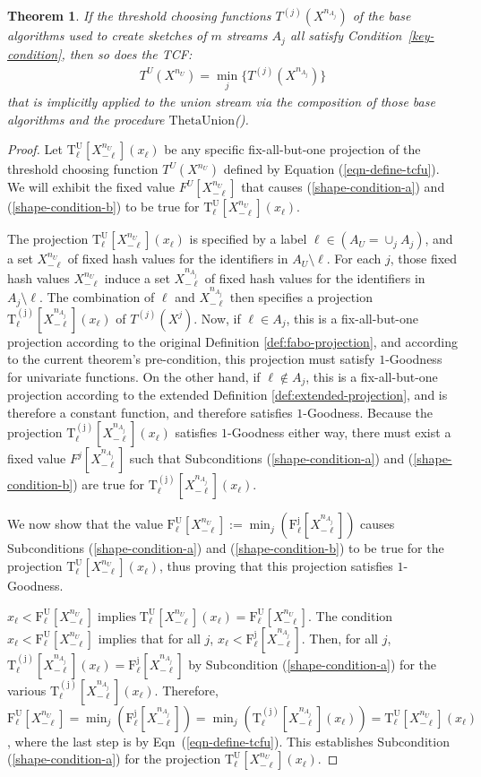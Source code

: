 \documentclass{article}
\newcommand{\tuxn}{\mathrm{T^U_\ell}[X^{n_U}_{-\ell}](x_\ell)}
\newcommand{\tjxn}{\mathrm{T^{(j)}_\ell}[X^{n_{A_j}}_{-\ell}](x_\ell)}
\newcommand{\xnj}{X^{n_{A_j}}}
\newcommand{\xnjml}{X^{n_{A_j}}_{-\ell}}
\newcommand{\xon}{X^{n_{U}}}
\newcommand{\xnu}{X^{n_U}}
\newcommand{\xnuml}{X^{n_{U}}_{-\ell}}
\newcommand{\atuxn}{\mathrm{T^U_\ell}[X^{n_U}_{-\ell}](x_\ell)}
\newcommand{\atjxn}{\mathrm{T^{(j)}_\ell}[X^{n_{A_j}}_{-\ell}](x_\ell)}
\newcommand{\afuxn}{\mathrm{F^U_\ell}[X^{n_U}_{-\ell}]}
\newcommand{\afjxn}{\mathrm{F^j_\ell}[X^{n_{A_j}}_{-\ell}]}
\newtheorem{theorem}{Theorem}[section]
\newcommand{\thetaunion}{\mathrm{ThetaUnion}}
\begin{document}
\begin{theorem}\label{thm-union-preserves-condition} \label{thm:preserved}
If the threshold choosing functions $T^{(j)}(\xnj)$ of the base algorithms used to create sketches 
of $m$ streams $A_j$ all satisfy Condition~\ref{key-condition},
then so does the TCF:
\begin{align}
T^U(\xon) = \min_j \{T^{(j)}(\xnj)\}\label{eqn-define-tcfu}
\end{align}
that is implicitly applied to the union stream via the composition of those base
algorithms and the procedure $\thetaunion$().
\end{theorem}
\begin{proof}
Let $\tuxn$ be any specific fix-all-but-one projection of the threshold choosing function 
$T^U(\xnu)$ defined by Equation (\ref{eqn-define-tcfu}). We will exhibit the fixed value $F^U[\xnuml]$ that
causes (\ref{shape-condition-a}) and (\ref{shape-condition-b}) to be true for $\tuxn$.

The projection $\tuxn$ is specified by a label $\ell \in (A_U = \cup_j A_j)$, and a set $\xnuml$ 
of fixed hash values for the identifiers in 
\mbox{$A_U \!\! \setminus \! \ell$}.
For each $j$, those fixed hash values $\xnuml$ induce a set $\xnjml$ of 
fixed hash values for the identifiers in $A_j \! \setminus \! \ell$. 
The combination of $\ell$ and $\xnjml$ then specifies
a projection $\tjxn$ of $T^{(j)}(X^j)$. 
Now, if $\ell \in A_j$, this is a fix-all-but-one projection according to the original Definition \ref{def:fabo-projection},
and according to the current theorem's pre-condition, this projection must satisfy $1$-Goodness for univariate functions.
On the other hand, if $\ell \not \in A_j$, this is a fix-all-but-one projection according to the extended Definition 
\ref{def:extended-projection}, and is therefore a constant function, and therefore 
satisfies $1$-Goodness.
Because the projection $\tjxn$ 
satisfies $1$-Goodness
either way, there must exist a fixed value $F^j[\xnjml]$
such that Subconditions (\ref{shape-condition-a}) and (\ref{shape-condition-b}) are true for $\tjxn$. 

\noindent We now show that the value $\afuxn := \min_j (\afjxn)$
causes Subconditions (\ref{shape-condition-a}) and (\ref{shape-condition-b}) to be true for the projection
$\tuxn$, thus proving that this projection
satisfies $1$-Goodness.


\medskip 
{} 
$x_\ell < \afuxn \; \mathrm{implies} \; \atuxn = \afuxn $. 
The condition $x_\ell < \afuxn$ implies
that  for all $j$, $x_\ell < \afjxn$. Then, for all $j$, $\atjxn = \afjxn$ 
by Subcondition (\ref{shape-condition-a}) for the various $\atjxn$. Therefore,
$\afuxn = \min_j (\afjxn) = \min_j (\atjxn) = \atuxn$,
where the last step is by Eqn~(\ref{eqn-define-tcfu}).
This establishes Subcondition (\ref{shape-condition-a}) for the projection $\atuxn$. 


\end{proof}
\end{document}

